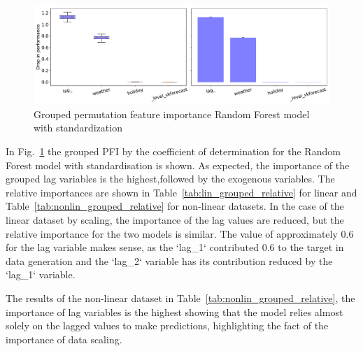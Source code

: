 \begin{figure}[t]
    \centering
    \includegraphics[width=\textwidth]{chapters/04_feature_importance_estimation/img/standardization/lin/rf_forecaster_scaled_grouped_permutation_importance}
    \caption{Grouped permutation feature importance Random Forest model with standardization}
    \label{fig:rf_grouped_permutation_importance}
\end{figure}






In Fig.~\ref{fig:rf_grouped_permutation_importance} the grouped PFI by the coefficient of determination for the Random Forest model with standardisation is shown.
As expected, the importance of the grouped lag variables is the highest,followed by the exogenous variables.
The relative importances are shown in Table~\ref{tab:lin_grouped_relative} for linear and Table~\ref{tab:nonlin_grouped_relative} for non-linear datasets.
In the case of the linear dataset by scaling, the importance of the lag values are reduced, but the relative importance for the two models is similar.
The value of approximately 0.6 for the lag variable makes sense, as the `lag\_1` contributed 0.6 to the target in data generation
and the `lag\_2` variable has its contribution reduced by the `lag\_1` variable.

The results of the non-linear dataset in Table~\ref{tab:nonlin_grouped_relative}, the importance of lag variables is the highest showing that the model relies almost solely on the lagged values to make predictions, highlighting the fact of the importance of data scaling.